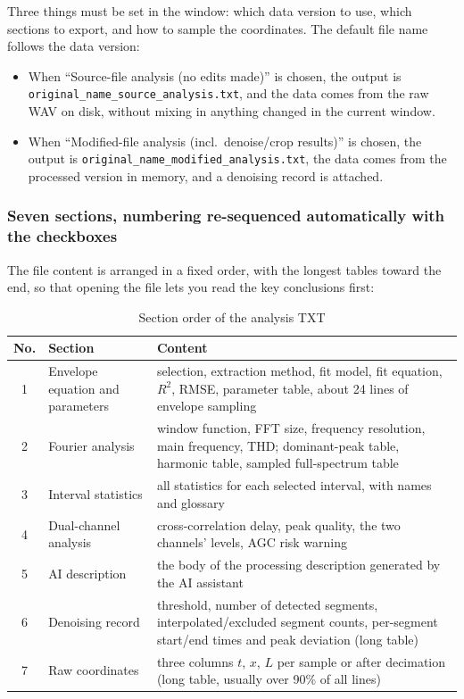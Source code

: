 \documentclass[UTF8,a4paper,12pt]{ctexart}
\begin{document}
Three things must be set in the window: which data version to use, which sections to export, and how to sample the coordinates. The default file name follows the data version:

\begin{itemize}
  \item When ``Source-file analysis (no edits made)'' is chosen, the output is \nolinkurl{original_name_source_analysis.txt}, and the data comes from the raw WAV on disk, without mixing in anything changed in the current window.
  \item When ``Modified-file analysis (incl.\ denoise/crop results)'' is chosen, the output is \nolinkurl{original_name_modified_analysis.txt}, the data comes from the processed version in memory, and a denoising record is attached.
\end{itemize}

\subsubsection*{Seven sections, numbering re-sequenced automatically with the checkboxes}

The file content is arranged in a fixed order, with the longest tables toward the end, so that opening the file lets you read the key conclusions first:

\begin{table}[htbp]
\centering
\caption{Section order of the analysis TXT}
\begin{tabular}{@{}clp{7.2cm}@{}}
\toprule
No. & Section & Content \\
\midrule
1 & Envelope equation and parameters & selection, extraction method, fit model, fit equation, $R^2$, RMSE, parameter table, about 24 lines of envelope sampling \\
2 & Fourier analysis & window function, FFT size, frequency resolution, main frequency, THD; dominant-peak table, harmonic table, sampled full-spectrum table \\
3 & Interval statistics & all statistics for each selected interval, with names and glossary \\
4 & Dual-channel analysis & cross-correlation delay, peak quality, the two channels' levels, AGC risk warning \\
5 & AI description & the body of the processing description generated by the AI assistant \\
6 & Denoising record & threshold, number of detected segments, interpolated/excluded segment counts, per-segment start/end times and peak deviation (long table) \\
7 & Raw coordinates & three columns $t$, $x$, $L$ per sample or after decimation (long table, usually over 90\% of all lines) \\
\bottomrule
\end{tabular}
\end{table}
\end{document}
